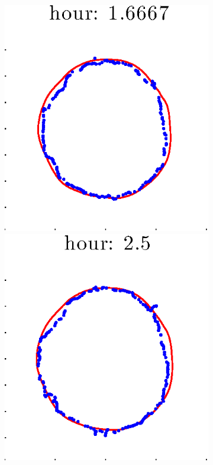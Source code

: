 \documentclass[12pt]{article}
\begin{document}
\begin{figure}[h!]
\begin{subfigure}[b]{.3\textwidth}
		\includegraphics[height=.15\textheight]{Pos0/secondhalf/full3.eps}
		\includegraphics[height=.15\textheight]{Pos0/secondhalf/full4.eps}

\end{subfigure}
\end{figure}
\end{document}
